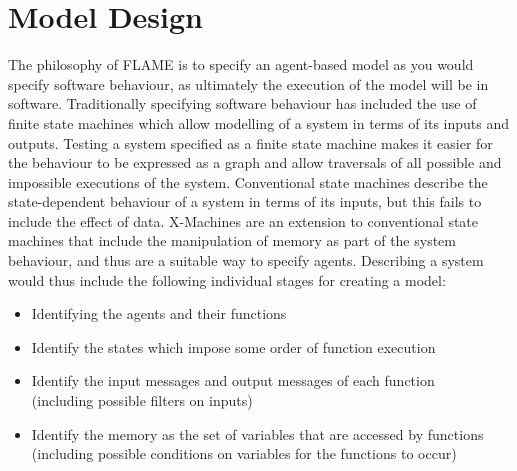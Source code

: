 \section{Model Design}
\label{model_design}

The philosophy of FLAME is to specify an agent-based model as you would specify
software behaviour, as ultimately the execution of the model will be in software.
Traditionally specifying software behaviour has included the use of finite state
machines which allow modelling of a system in terms of its inputs and outputs. Testing a system
specified as a finite state machine makes it easier for the behaviour to be
expressed as a graph and allow traversals of all possible and impossible
executions of the system. Conventional state machines describe the
state-dependent behaviour of a system in terms of its inputs, but this fails to
include the effect of data. X-Machines are an extension to conventional state
machines that include the manipulation of memory as part of the system behaviour,
and thus are a suitable way to specify agents. Describing a system would thus
include the following individual stages for creating a model:

\begin{itemize}
\item Identifying the agents and their functions
\item Identify the states which impose some order of function execution
\item Identify the input messages and output messages of each function 
\\(including possible filters on inputs)
\item Identify the memory as the set of variables that are accessed by
functions \\(including possible conditions on variables for the functions to
occur)
\end{itemize}

